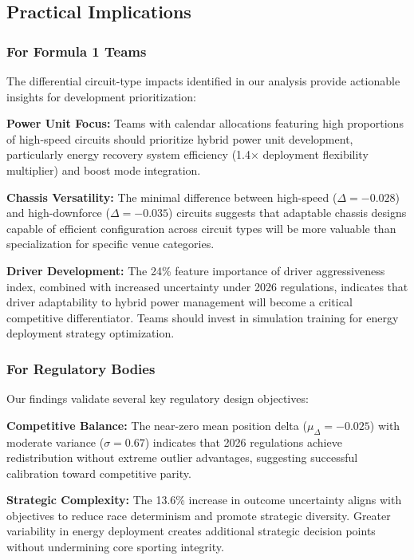 \documentclass[conference]{IEEEtran}
\begin{document}
\subsection{Practical Implications}

\subsubsection{For Formula 1 Teams}

The differential circuit-type impacts identified in our analysis provide actionable insights for development prioritization:

\textbf{Power Unit Focus:} Teams with calendar allocations featuring high proportions of high-speed circuits should prioritize hybrid power unit development, particularly energy recovery system efficiency (1.4$\times$ deployment flexibility multiplier) and boost mode integration.

\textbf{Chassis Versatility:} The minimal difference between high-speed ($\Delta = -0.028$) and high-downforce ($\Delta = -0.035$) circuits suggests that adaptable chassis designs capable of efficient configuration across circuit types will be more valuable than specialization for specific venue categories.

\textbf{Driver Development:} The 24\% feature importance of driver aggressiveness index, combined with increased uncertainty under 2026 regulations, indicates that driver adaptability to hybrid power management will become a critical competitive differentiator. Teams should invest in simulation training for energy deployment strategy optimization.

\subsubsection{For Regulatory Bodies}

Our findings validate several key regulatory design objectives:

\textbf{Competitive Balance:} The near-zero mean position delta ($\mu_\Delta = -0.025$) with moderate variance ($\sigma = 0.67$) indicates that 2026 regulations achieve redistribution without extreme outlier advantages, suggesting successful calibration toward competitive parity.

\textbf{Strategic Complexity:} The 13.6\% increase in outcome uncertainty aligns with objectives to reduce race determinism and promote strategic diversity. Greater variability in energy deployment creates additional strategic decision points without undermining core sporting integrity.
\end{document}
